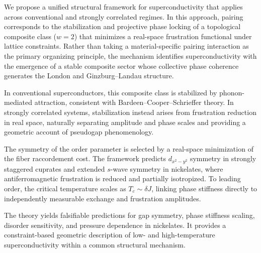   We propose a unified structural framework for superconductivity
  that applies across conventional and strongly correlated regimes.
  In this approach, pairing corresponds to the stabilization and
  projective phase locking of a topological composite class ($w=2$)
  that minimizes a real-space frustration functional under lattice constraints.
  Rather than taking a material-specific pairing interaction as the primary
  organizing principle, the mechanism identifies superconductivity with the
  emergence of a stable composite sector whose collective phase coherence
  generates the London and Ginzburg--Landau structure.

  In conventional superconductors, this composite class is stabilized
  by phonon-mediated attraction, consistent with Bardeen--Cooper--Schrieffer theory.
  In strongly correlated systems, stabilization instead arises from
  frustration reduction in real space, naturally separating amplitude
  and phase scales and providing a geometric account of pseudogap phenomenology.

  The symmetry of the order parameter is selected by a real-space
  minimization of the fiber raccordement cost.
  The framework predicts $d_{x^2-y^2}$ symmetry in strongly staggered
  cuprates and extended $s$-wave symmetry in nickelates,
  where antiferromagnetic frustration is reduced and partially isotropized.
  To leading order, the critical temperature scales as
  $T_c \sim \delta J$, linking phase stiffness directly
  to independently measurable exchange and frustration amplitudes.

  The theory yields falsifiable predictions for gap symmetry,
  phase stiffness scaling, disorder sensitivity,
  and pressure dependence in nickelates.
  It provides a constraint-based geometric description
  of low- and high-temperature superconductivity
  within a common structural mechanism.
